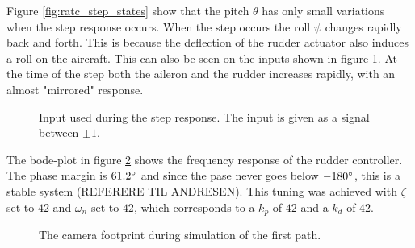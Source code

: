 Figure \ref{fig:ratc_step_states} show that the pitch $\theta$ has only small variations when the step response occurs. When the step occurs the roll $\psi$ changes rapidly back and forth. This is because the deflection of the rudder actuator also induces a roll on the aircraft. This can also be seen on the inputs shown in figure \ref{fig:ratc_step_input}. At the time of the step both the aileron and the rudder increases rapidly, with an almost "mirrored" response.

\begin{figure}[]
    \centering
    \caption{Input used during the step response. The input is given as a signal between $\pm1$.}
	\label{fig:ratc_step_input}
\end{figure}

The bode-plot in figure \ref{fig:ratc_bode} shows the frequency response of the rudder controller. The phase margin is $61.2\degree$ and since the pase never goes below $-180\degree$, this is a stable system (REFERERE TIL ANDRESEN). This tuning was achieved with $\zeta$ set to $42$ and $\omega_n$ set to $42$, which corresponds to a $k_p$ of $42$ and a $k_d$ of $42$.

\begin{figure}[]
    \centering
    \caption{The camera footprint during simulation of the first path.}
	\label{fig:ratc_bode}
\end{figure}


